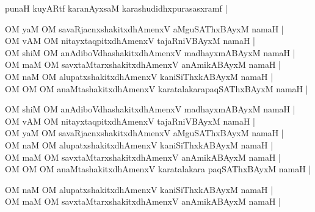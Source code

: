 \begin{entry}
\smallskip
\begin{shl}
punaH kuyARtf karanAyxsaM karashudidhxpurasasxramf |
\end{shl}
\smallskip
{}
\smallskip
{}
\smallskip
\begin{shl}
OM yaM OM savaRjacnxshakitxdhAmenxV aMguSAThxBAyxM namaH |\\[2pt]
OM vAM OM nitayxtaqpitxdhAmenxV tajaRniVBAyxM namaH |\\[2pt]
OM shiM OM anAdiboVdhashakitxdhAmenxV madhayxmABAyxM namaH |\\[2pt]
OM maM OM savxtaMtarxshakitxdhAmenxV anAmikABAyxM namaH |\\[2pt]
OM naM OM alupatxshakitxdhAmenxV kaniSiThxkABAyxM namaH |\\[2pt]
OM OM OM anaMtashakitxdhAmenxV karatalakarapaqSAThxBAyxM namaH |
\end{shl}
\smallskip
{}
\smallskip
\begin{shl}
OM shiM OM anAdiboVdhashakitxdhAmenxV madhayxmABAyxM namaH |\\[2pt]
OM vAM OM nitayxtaqpitxdhAmenxV tajaRniVBAyxM namaH |\\[2pt]
OM yaM OM savaRjacnxshakitxdhAmenxV aMguSAThxBAyxM namaH |\\[2pt]
OM naM OM alupatxshakitxdhAmenxV kaniSiThxkABAyxM namaH |\\[2pt]
OM maM OM savxtaMtarxshakitxdhAmenxV anAmikABAyxM namaH |\\[2pt]
OM OM OM anaMtashakitxdhAmenxV karatalakara paqSAThxBAyxM namaH |
\end{shl}
\smallskip
{}
\smallskip
\begin{shl}
OM naM OM alupatxshakitxdhAmenxV kaniSiThxkABAyxM namaH |\\[2pt]
OM maM OM savxtaMtarxshakitxdhAmenxV anAmikABAyxM namaH |\\[2pt]

\end{shl}
\end{entry}
